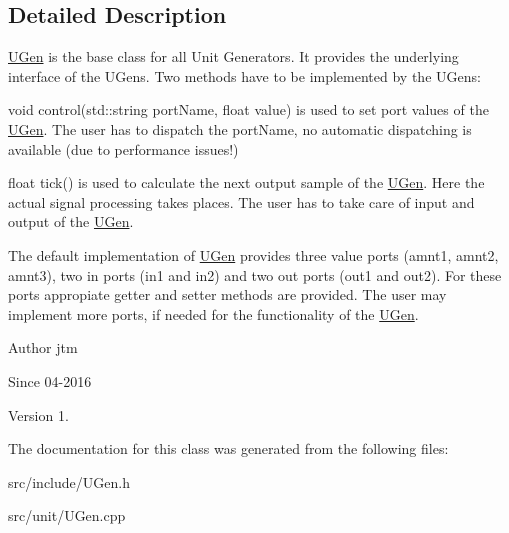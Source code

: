 \subsection{Detailed Description}
\hyperlink{classunit_1_1UGen}{U\-Gen} is the base class for all Unit Generators. It provides the underlying interface of the U\-Gens. Two methods have to be implemented by the U\-Gens\-:


\begin{DoxyItemize}
\item void control(std\-::string port\-Name, float value) is used to set port values of the \hyperlink{classunit_1_1UGen}{U\-Gen}. The user has to dispatch the port\-Name, no automatic dispatching is available (due to performance issues!)
\item float tick() is used to calculate the next output sample of the \hyperlink{classunit_1_1UGen}{U\-Gen}. Here the actual signal processing takes places. The user has to take care of input and output of the \hyperlink{classunit_1_1UGen}{U\-Gen}.
\end{DoxyItemize}

The default implementation of \hyperlink{classunit_1_1UGen}{U\-Gen} provides three value ports (amnt1, amnt2, amnt3), two in ports (in1 and in2) and two out ports (out1 and out2). For these ports appropiate getter and setter methods are provided. The user may implement more ports, if needed for the functionality of the \hyperlink{classunit_1_1UGen}{U\-Gen}.

\begin{DoxyAuthor}{Author}
jtm 
\end{DoxyAuthor}
\begin{DoxySince}{Since}
04-\/2016 
\end{DoxySince}
\begin{DoxyVersion}{Version}
1. 
\end{DoxyVersion}


The documentation for this class was generated from the following files\-:\begin{DoxyCompactItemize}
\item 
src/include/U\-Gen.\-h\item 
src/unit/U\-Gen.\-cpp\end{DoxyCompactItemize}

